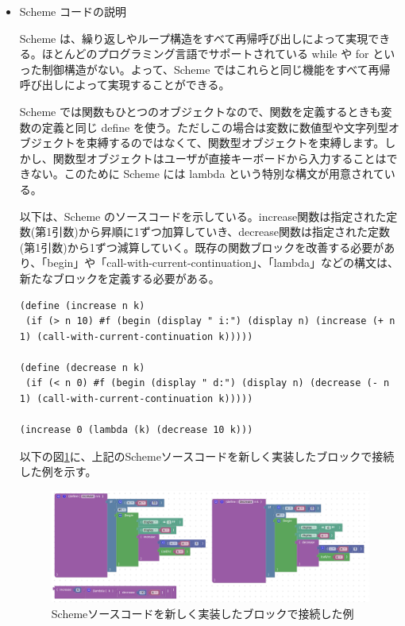 \documentclass{risepaper}
\begin{document}
\begin{itemize}   

\item Scheme コードの説明

Scheme は、繰り返しやループ構造をすべて再帰呼び出しによって実現できる。ほとんどのプログラミング言語でサポートされている while や for といった制御構造がない。よって、Scheme ではこれらと同じ機能をすべて再帰呼び出しによって実現することができる。

Scheme では関数もひとつのオブジェクトなので、関数を定義するときも変数の定義と同じ define を使う。ただしこの場合は変数に数値型や文字列型オブジェクトを束縛するのではなくて、関数型オブジェクトを束縛します。しかし、関数型オブジェクトはユーザが直接キーボードから入力することはできない。このために Scheme には lambda という特別な構文が用意されている。

以下は、Scheme のソースコードを示している。increase関数は指定された定数(第1引数)から昇順に1ずつ加算していき、decrease関数は指定された定数(第1引数)から1ずつ減算していく。既存の関数ブロックを改善する必要があり、「begin」や「call-with-current-continuation」、「lambda」などの構文は、新たなブロックを定義する必要がある。

\begin{lstlisting}[basicstyle=\ttfamily\footnotesize]
(define (increase n k)
 (if (> n 10) #f (begin (display " i:") (display n) (increase (+ n 1) (call-with-current-continuation k)))))

(define (decrease n k)
 (if (< n 0) #f (begin (display " d:") (display n) (decrease (- n 1) (call-with-current-continuation k)))))

(increase 0 (lambda (k) (decrease 10 k)))
\end{lstlisting}

以下の図\ref{fig:scheme_blocks_example}に、上記のSchemeソースコードを新しく実装したブロックで接続した例を示す。

\begin{figure}[h]
\begin{center}
\includegraphics[scale=0.5]{img/scheme_blocks_example.PNG}
\caption{Schemeソースコードを新しく実装したブロックで接続した例}%
\label{fig:scheme_blocks_example}
\end{center}%
\end{figure}%



\end{itemize}
\end{document}

